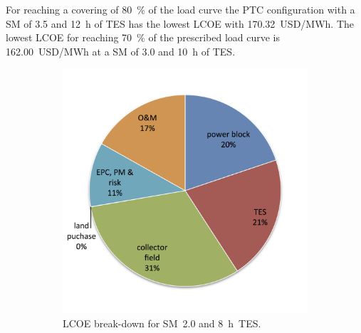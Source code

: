For reaching a covering of 80~\% of the load curve the PTC configuration with a SM of 3.5 and \SI{12}{h} of TES has the lowest LCOE with \SI{170.32}{USD/MWh}. The lowest LCOE for reaching 70~\% of the prescribed load curve is \SI{162.00}{USD/MWh} at a SM of 3.0 and \SI{10}{h} of TES.
\begin{figure}[!htbp]
        \centering                
        \begin{subfigure}[b]{0.5\textwidth}
                \centering
                \includegraphics[width=1\textwidth]{FIG/PTC_LCOE_lowinvest_BreakDown}
                \caption{LCOE break-down for SM~2.0 and \SI{8}{h}~TES.}\label{PTC_LCOE_lowinvest_BreakDown}
        \end{subfigure}%
        ~
        \begin{subfigure}[b]{0.5\textwidth}
                \centering

\end{subfigure}
\end{figure}
